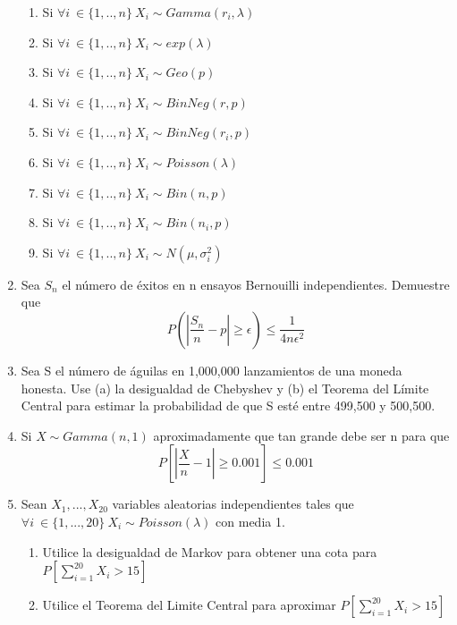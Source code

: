 \documentclass[11pt,a4paper]{report}
\begin{document}
\begin{enumerate}
{\begin{enumerate}
			    \item{Si $\forall i \ \in \lbrace 1,..,n \rbrace \ X_{i} \sim Gamma(r_{i},\lambda)$ }
                \item{Si $\forall i \ \in \lbrace 1,..,n \rbrace \ X_{i} \sim exp(\lambda)$ }
                \item{Si $\forall i \ \in \lbrace 1,..,n \rbrace \ X_{i} \sim Geo(p)$ }
                \item{Si $\forall i \ \in \lbrace 1,..,n \rbrace \ X_{i} \sim BinNeg(r,p)$ }
                \item{Si $\forall i \ \in \lbrace 1,..,n \rbrace \ X_{i} \sim BinNeg(r_{i},p)$ }
                \item{Si $\forall i \ \in \lbrace 1,..,n \rbrace \ X_{i} \sim Poisson(\lambda)$ }
                \item{Si $\forall i \ \in \lbrace 1,..,n \rbrace \ X_{i} \sim Bin(n,p)$ }
                \item{Si $\forall i \ \in \lbrace 1,..,n \rbrace \ X_{i} \sim Bin(n_{i},p)$ }
                \item{Si $\forall i \ \in \lbrace 1,..,n \rbrace \ X_{i} \sim N(\mu,\sigma_{i}^2)$ }
			\end{enumerate}
		}

		\item{
		Sea $S_{n}$ el número de éxitos en n ensayos Bernouilli independientes. Demuestre que $$P(|\frac{S_{n}}{n}-p|\geq \epsilon)\leq \frac{1}{4n\epsilon^2}$$
			
		}

		\item{
		Sea S el número de águilas en 1,000,000 lanzamientos de una moneda honesta. Use (a) la desigualdad de Chebyshev y (b) el Teorema del Límite Central para estimar la probabilidad de que S esté entre 499,500 y 500,500.
		}

		\item{
			
          Si $X \sim Gamma(n,1)$ aproximadamente que tan grande debe ser n para que 
          $$P[|\frac{X}{n}-1|\geq 0.001]\leq 0.001$$
		}

		\item{
			Sean $X_{1},...,X_{20}$ variables aleatorias independientes tales que $\forall i \ \in \lbrace 1,...,20 \rbrace \ X_{i} \sim Poisson(\lambda) $ con media 1.\\
			\begin{enumerate}
			    \item{Utilice la desigualdad de Markov para obtener una cota para $P[\sum_{i=1}^{20}X_{i}>15]$} 
			    \item{Utilice el Teorema del Limite Central para aproximar $P[\sum_{i=1}^{20}X_{i}>15]$}
			\end{enumerate}
		}


\end{enumerate}
\end{document}
